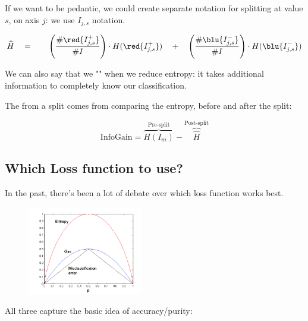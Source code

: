         If we want to be pedantic, we could create separate notation for splitting at value $s$, on axis $j$: we use $I_{j,s}$ notation.

        \begin{equation}
            \widehat{H} 
            \quad=\qquad 
            \Bigg(\frac{\#\red{I^+_{j,s}}}{\#I} \Bigg) \cdot H(\red{I^+_{j,s}}) 
            \quad+\quad 
            \Bigg(\frac{\#\blu{I^-_{j,s}}}{\#I} \Bigg) \cdot H(\blu{I^-_{j,s}})
        \end{equation}

        We can also say that we "" when we reduce entropy: it takes  additional information to completely know our classification.\\

        \begin{kequation}
            The  from a split comes from comparing the entropy, before and after the split:

            \begin{equation*}
                \text{InfoGain} = \overbrace{H(I_m)}^{\text{Pre-split}} - \overbrace{\hat{H}}^{\text{Post-split}}
            \end{equation*}
        \end{kequation}


    \phantom{}

    \subsection{Which Loss function to use?}

        In the past, there's been a lot of debate over which loss function works best.

        \begin{figure}[H]
            \centering
            \includegraphics[width=50mm,scale=0.5]{images/nonparametric_images/classification_loss.png}
        \end{figure}

        All three capture the basic idea of accuracy/purity:

